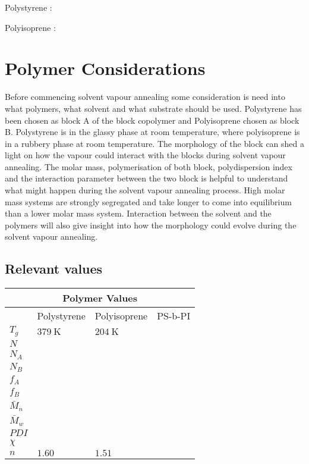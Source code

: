 \documentclass[MasterThesisMain.tex]{subfiles}
\begin{document}
\setpolymerdelim[]
Polystyrene :
\bigskip


\setpolymerdelim[]
Polyisoprene :


\section{Polymer Considerations}
Before commencing solvent vapour annealing some consideration is need into what polymers, what solvent and what substrate should be used. Polystyrene has been chosen as block A of the block copolymer and Polyisoprene chosen as block B. Polystyrene is in the glassy phase at room temperature, where polyisoprene is in a rubbery phase at room temperature. The morphology of the block can shed a light on how the vapour could interact with the blocks during solvent vapour annealing. The molar mass, polymerisation of both block, polydispersion index and the interaction parameter between the two block is helpful to understand what might happen during the solvent vapour annealing process. High molar mass systems are strongly segregated and take longer to come into equilibrium than a lower molar mass system. Interaction between the solvent and the polymers will also give insight into how the morphology could evolve during the solvent vapour annealing.

\subsection{Relevant values}

\begin{tabular}{ |p{3cm}||p{3cm}|p{3cm}|p{3cm}|  }
 \hline
 \multicolumn{4}{|c|}{Polymer Values} \\
 \hline
    & Polystyrene & Polyisoprene & PS-b-PI\\
 \hline
 $T_g$& $\SI{379}{\kelvin}$   & $\SI{204}{\kelvin}$  &   \\
 $N$&  &  &  \\
 $N_A$&  &  &  \\
 $N_B$&  &  &  \\
 $f_A$&  &  &  \\
 $f_B$&  &  &  \\
 $\bar{M}_n$&  &  &  \\
 $\bar{M}_w$&  &  &  \\
 $PDI$&  &  &  \\
 $\chi$&  &  &  \\
 $n$& $1.60$ & $1.51$ &\\
 \hline
\end{tabular}
\end{document}
